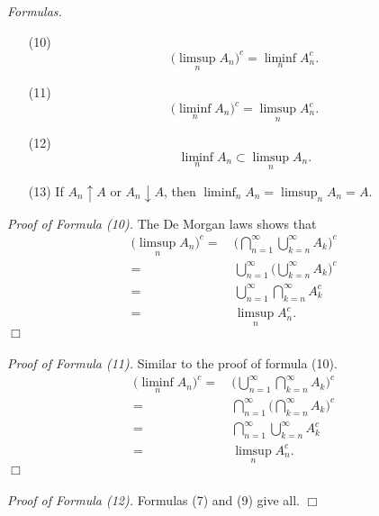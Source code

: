 \documentclass{article}
\begin{document}
\emph{Formulas.}
\begin{enumerate}
\item[(10)]
  \[
    \Big( \limsup_{n} A_n \Big)^c
    = \liminf_{n} A_n^c.
  \]

\item[(11)]
  \[
    \Big( \liminf_{n} A_n \Big)^c
    = \limsup_{n} A_n^c.
  \]

\item[(12)]
  \[
    \liminf_{n} A_n \subset \limsup_{n} A_n.
  \]

\item[(13)]
  If $A_n \uparrow A$ or $A_n \downarrow A$,
  then $\liminf_n A_n = \limsup_n A_n= A$. \\
\end{enumerate}



\emph{Proof of Formula (10).}
  The De Morgan laws shows that
  \begin{align*}
    \Big( \limsup_{n} A_n \Big)^c
    =
    & \:
      \Bigg( \bigcap_{n=1}^{\infty} \bigcup_{k=n}^{\infty} A_k \Bigg)^c \\
    =
    & \:
      \bigcup_{n=1}^{\infty} \Bigg( \bigcup_{k=n}^{\infty} A_k \Bigg)^c \\
    =
    & \:
      \bigcup_{n=1}^{\infty} \bigcap_{k=n}^{\infty} A_k^{c} \\
    =
    & \:
      \limsup_{n} A_n^c.
  \end{align*}
$\Box$ \\\\



\emph{Proof of Formula (11).}
  Similar to the proof of formula (10).
  \begin{align*}
    \Big( \liminf_{n} A_n \Big)^c
    =
    & \:
      \Bigg( \bigcup_{n=1}^{\infty} \bigcap_{k=n}^{\infty} A_k \Bigg)^c \\
    =
    & \:
      \bigcap_{n=1}^{\infty} \Bigg( \bigcap_{k=n}^{\infty} A_k \Bigg)^c \\
    =
    & \:
      \bigcap_{n=1}^{\infty} \bigcup_{k=n}^{\infty} A_k^{c} \\
    =
    & \:
      \limsup_{n} A_n^c.
  \end{align*}
$\Box$ \\\\



\emph{Proof of Formula (12).}
  Formulas (7) and (9) give all.
$\Box$ \\\\
\end{document}
